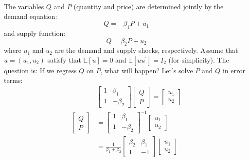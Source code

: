 \begin{enumerate}
\begin{eg}
            The variables $Q$ and $P$ (quantity and price) are determined jointly by the demand equation:
            \[Q = -\beta_1 P + u_1\]
            and supply function:
            \[Q = \beta_2 P + u_2\]
            where $u_1$ and $u_2$ are the demand and supply shocks, respectively.
            Assume that $u = (u_1, u_2)$ satisfy that $\mathbb{E}[u] = 0$ and $\mathbb{E}[u u^{\prime}] = I_2$ (for simplicity).
            The question is: If we regress $Q$ on $P$, what will happen?
            Let's solve $P$ and $Q$ in error terms:
            \begin{align*}
                & \begin{bmatrix}
                    1 & \beta_1 \\
                    1 & -\beta_2
                \end{bmatrix}
                \begin{bmatrix}
                    Q \\
                    P
                \end{bmatrix}
                = \begin{bmatrix}
                    u_1 \\
                    u_2
                \end{bmatrix} \\
                \begin{bmatrix}
                    Q \\
                    P
                \end{bmatrix}
                &= \begin{bmatrix}
                    1 & \beta_1 \\
                    1 & -\beta_2
                \end{bmatrix}^{-1}
                \begin{bmatrix}
                    u_1 \\
                    u_2
                \end{bmatrix} \\
                &= \frac{1}{\beta_1 + \beta_2}
                \begin{bmatrix}
                    \beta_2 & \beta_1 \\
                    1 & -1
                \end{bmatrix}
                \begin{bmatrix}
                    u_1 \\
                    u_2
                \end{bmatrix} \\

\end{align*}
\end{eg}
\end{enumerate}
